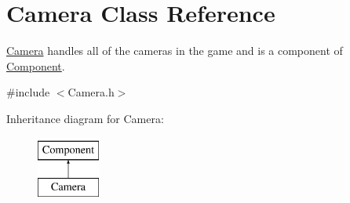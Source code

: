 \hypertarget{class_camera}{}\section{Camera Class Reference}
\label{class_camera}


\mbox{\hyperlink{class_camera}{Camera}} handles all of the cameras in the game and is a component of \mbox{\hyperlink{class_component}{Component}}.  




{\ttfamily \#include $<$Camera.\+h$>$}

Inheritance diagram for Camera\+:\begin{figure}[H]
\begin{center}
\leavevmode
\includegraphics[height=2.000000cm]{class_camera}
\end{center}
\end{figure}
